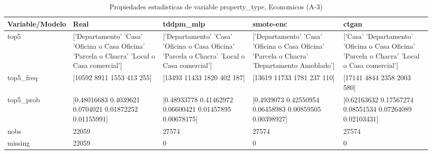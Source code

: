 \begin{table}[H]
\centering
\fontsize{8}{14}\selectfont
\caption{Propiedades  estadisticas de variable property\_type, Economicos (A-3)}
\label{table-stats-economicos-a-3-property_type}
\begin{tabular}{|l|m{10em}|m{10em}|m{10em}|m{10em}|}
\hline
 \rowcolor[gray]{0.8}
Variable/Modelo & Real & tddpm\_mlp & smote-enc & ctgan \\
\hline top5 & ['Departamento' 'Casa' 'Oficina o Casa Oficina' 'Parcela o Chacra'
 'Local o Casa comercial'] & ['Departamento' 'Casa' 'Oficina o Casa Oficina' 'Parcela o Chacra'
 'Local o Casa comercial'] & ['Departamento' 'Casa' 'Oficina o Casa Oficina' 'Parcela o Chacra'
 'Departamento Amoblado'] & ['Casa' 'Departamento' 'Oficina o Casa Oficina' 'Parcela o Chacra'
 'Local o Casa comercial'] \\
\hline top5\_freq & [10592  8911  1553   413   255] & [13493 11433  1820   402   187] & [13619 11733  1781   237   110] & [17141  4844  2358  2003   580] \\
\hline top5\_prob & [0.48016683 0.4039621  0.0704021  0.01872252 0.01155991] & [0.48933778 0.41462972 0.06600421 0.01457895 0.00678175] & [0.4939073  0.42550954 0.06458983 0.00859505 0.00398927] & [0.62163632 0.17567274 0.08551534 0.07264089 0.02103431] \\
\hline nobs & 22059 & 27574 & 27574 & 27574 \\
\hline missing & 22059 & 0 & 0 & 0 \\
\hline
\end{tabular}
\end{table}
